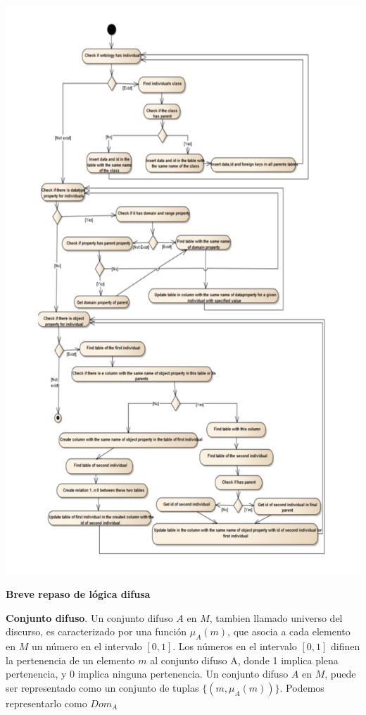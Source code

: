 \documentclass{fancyslides}
\begin{document}
\begin{frame}
\misc

\begin{center}
\includegraphics[scale=0.1]{inserting_data}
\end{center}
\end{frame}

\begin{frame}
\end{frame}

\begin{frame}
\misc
{ \textbf{Breve repaso de lógica difusa}
\newline

\justifying \textbf{Conjunto difuso}. Un conjunto difuso $A$ en $M$, tambien llamado universo del discurso, es caracterizado por una función
$\mu_{A}(m)$, que asocia a cada elemento en $M$ un número en el intervalo $[0,1]$. Los números en el intervalo $[0,1]$ difinen la pertenencia
de un elemento $m$ al conjunto difuso A, donde 1 implica plena pertenencia, y 0 implica ninguna pertenencia.
Un conjunto difuso $A$ en $M$, puede ser representado como un conjunto de tuplas $\{ (m, \mu_{A}(m))\}$. Podemos representarlo como $Dom_{A}$

}
\end{frame}
\end{document}
